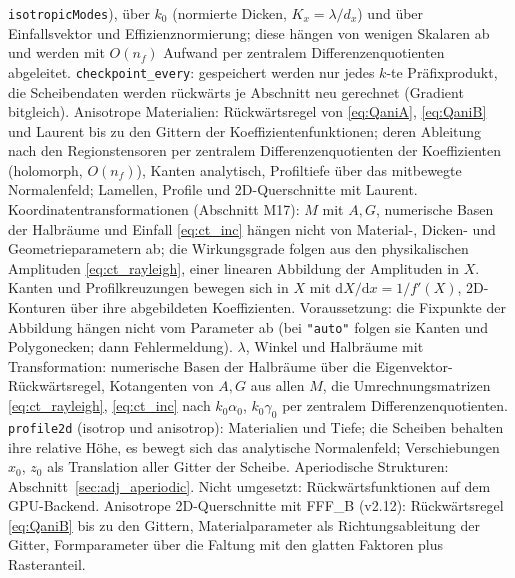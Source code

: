 \verb|isotropicModes|), über $k_0$ (normierte Dicken, $K_x=\lambda/d_x$) und über Einfallsvektor und
Effizienznormierung; diese hängen von wenigen Skalaren ab und werden mit $O(n_f)$ Aufwand per zentralem
Differenzenquotienten abgeleitet. \verb|checkpoint_every|: gespeichert werden nur jedes $k$-te Präfixprodukt, die
Scheibendaten werden rückwärts je Abschnitt neu gerechnet (Gradient bitgleich). Anisotrope Materialien: Rückwärtsregel
von \eqref{eq:QaniA}, \eqref{eq:QaniB} und Laurent bis zu den Gittern der Koeffizientenfunktionen; deren Ableitung nach
den Regionstensoren per zentralem Differenzenquotienten der Koeffizienten (holomorph, $O(n_f)$), Kanten analytisch,
Profiltiefe über das mitbewegte Normalenfeld; Lamellen, Profile und 2D-Querschnitte mit Laurent.
Koordinatentransformationen (Abschnitt M17): $M$ mit $A,G$, numerische Basen der Halbräume und Einfall
\eqref{eq:ct_inc} hängen nicht von Material-, Dicken- und Geometrieparametern ab; die Wirkungsgrade folgen aus den
physikalischen Amplituden \eqref{eq:ct_rayleigh}, einer linearen Abbildung der Amplituden in $X$. Kanten und
Profilkreuzungen bewegen sich in $X$ mit $\mathrm{d}X/\mathrm{d}x=1/f'(X)$, 2D-Konturen über ihre abgebildeten
Koeffizienten. Voraussetzung: die Fixpunkte der Abbildung hängen nicht vom Parameter ab (bei \verb|"auto"| folgen
sie Kanten und Polygonecken; dann Fehlermeldung). $\lambda$, Winkel und Halbräume mit Transformation: numerische
Basen der Halbräume über die Eigenvektor-Rückwärtsregel, Kotangenten von $A,G$ aus allen $M$, die
Umrechnungsmatrizen \eqref{eq:ct_rayleigh}, \eqref{eq:ct_inc} nach $k_0\alpha_0$, $k_0\gamma_0$ per zentralem
Differenzenquotienten. \verb|profile2d| (isotrop und anisotrop): Materialien und Tiefe; die Scheiben behalten ihre
relative Höhe, es bewegt sich das analytische Normalenfeld; Verschiebungen $x_0$, $z_0$ als Translation aller Gitter
der Scheibe. Aperiodische Strukturen: Abschnitt~\ref{sec:adj_aperiodic}. Nicht umgesetzt: Rückwärtsfunktionen auf
dem GPU-Backend. Anisotrope
2D-Querschnitte mit FFF\_B (v2.12): Rückwärtsregel \eqref{eq:QaniB} bis zu den Gittern, Materialparameter als
Richtungsableitung der Gitter, Formparameter über die Faltung mit den glatten Faktoren plus Rasteranteil.

